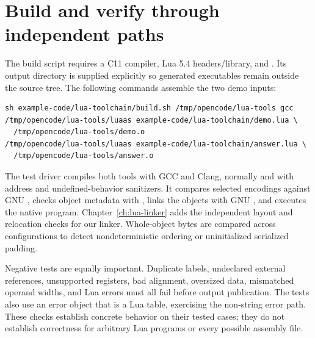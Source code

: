 \section{Build and verify through independent paths}
\label{sec:ch56-tests}

The build script requires a C11 compiler, Lua 5.4 headers/library, and .
Its output directory is supplied explicitly so generated executables remain outside the source tree.
The following commands assemble the two demo inputs:
\begin{verbatim}
sh example-code/lua-toolchain/build.sh /tmp/opencode/lua-tools gcc
/tmp/opencode/lua-tools/luaas example-code/lua-toolchain/demo.lua \
  /tmp/opencode/lua-tools/demo.o
/tmp/opencode/lua-tools/luaas example-code/lua-toolchain/answer.lua \
  /tmp/opencode/lua-tools/answer.o
\end{verbatim}

The test driver compiles both tools with GCC and Clang, normally and with address and undefined-behavior sanitizers.
It compares selected encodings against GNU , checks object metadata with , links the objects with GNU , and executes the native program.
Chapter~\ref{ch:lua-linker} adds the independent layout and relocation checks for our linker.
Whole-object bytes are compared across configurations to detect nondeterministic ordering or uninitialized serialized padding.

Negative tests are equally important.
Duplicate labels, undeclared external references, unsupported registers, bad alignment, oversized data, mismatched operand widths, and Lua errors must all fail before output publication.
The tests also use an error object that is a Lua table, exercising the non-string error path.
These checks establish concrete behavior on their tested cases; they do not establish correctness for arbitrary Lua programs or every possible assembly file.

